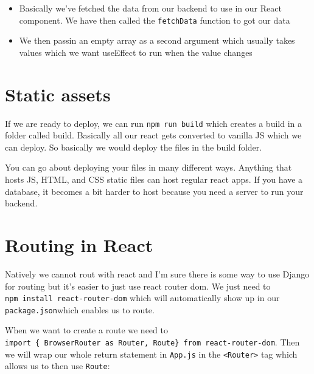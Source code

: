 \documentclass[
]{report}
\providecommand{\tightlist}{%
  \setlength{\itemsep}{0pt}\setlength{\parskip}{0pt}}
\theoremstyle{definition}
\theoremstyle{definition}
\theoremstyle{definition}
\theoremstyle{definition}
\theoremstyle{remark}
\begin{document}
\begin{itemize}
\tightlist
\item
  Basically we've fetched the data from our backend to use in our React
  component. We have then called the \texttt{fetchData} function to got our data
\item
  We then passin an empty array as a second argument which usually takes values
  which we want useEffect to run when the value changes
\end{itemize}

\hypertarget{static-assets}{%
\chapter{Static assets}\label{static-assets}}

If we are ready to deploy, we can run \texttt{npm\ run\ build} which creates a build in
a folder called build. Basically all our react gets converted to vanilla JS
which we can deploy. So basically we would deploy the files in the build
folder.

You can go about deploying your files in many different ways. Anything that
hosts JS, HTML, and CSS static files can host regular react apps. If you have a
database, it becomes a bit harder to host because you need a server to run your
backend.

\hypertarget{routing-in-react}{%
\chapter{Routing in React}\label{routing-in-react}}

Natively we cannot rout with react and I'm sure there is some way to use Django
for routing but it's easier to just use react router dom. We just need to \texttt{npm\ install\ react-router-dom} which will automatically show up in our \texttt{package.json}which enables us to route.

When we want to create a route we need to \texttt{import\ \{\ BrowserRouter\ as\ Router,\ Route\}\ from\ \textquotesingle{}react-router-dom}. Then we will wrap our whole return statement in
\texttt{App.js} in the \texttt{\textless{}Router\textgreater{}} tag which allows us to then use \texttt{Route}:
\end{document}

